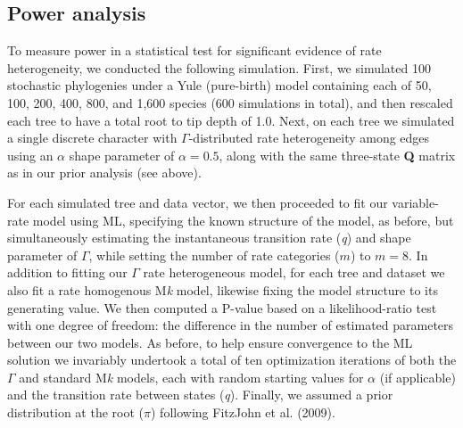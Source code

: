 \documentclass[fleqn,10pt,lineno]{wlpeerj} %
\begin{document}
\subsection{Power analysis}\label{power-analysis}

To measure power in a statistical test for significant evidence of rate heterogeneity, we conducted the following simulation. First, we simulated 100 stochastic phylogenies under a Yule (pure-birth) model containing each of 50, 100, 200, 400, 800, and 1,600 species (600 simulations in total), and then rescaled each tree to have a total root to tip depth of 1.0. Next, on each tree we simulated a single discrete character with \(\Gamma\)-distributed rate heterogeneity among edges using an \(\alpha\) shape parameter of \(\alpha = 0.5\), along with the same three-state \textbf{Q} matrix as in our prior analysis (see above).

For each simulated tree and data vector, we then proceeded to fit our variable-rate model using ML, specifying the known structure of the model, as before, but simultaneously estimating the instantaneous transition rate (\emph{q}) and shape parameter of \(\Gamma\), while setting the number of rate categories (\(m\)) to \(m = 8\). In addition to fitting our \(\Gamma\) rate heterogeneous model, for each tree and dataset we also fit a rate homogenous M\emph{k} model, likewise fixing the model structure to its generating value. We then computed a P-value based on a likelihood-ratio test with one degree of freedom: the difference in the number of estimated parameters between our two models. As before, to help ensure convergence to the ML solution we invariably undertook a total of ten optimization iterations of both the \(\Gamma\) and standard M\emph{k} models, each with random starting values for \(\alpha\) (if applicable) and the transition rate between states (\emph{q}). Finally, we assumed a prior distribution at the root (\(\pi\)) following FitzJohn et al. (2009).
\end{document}
